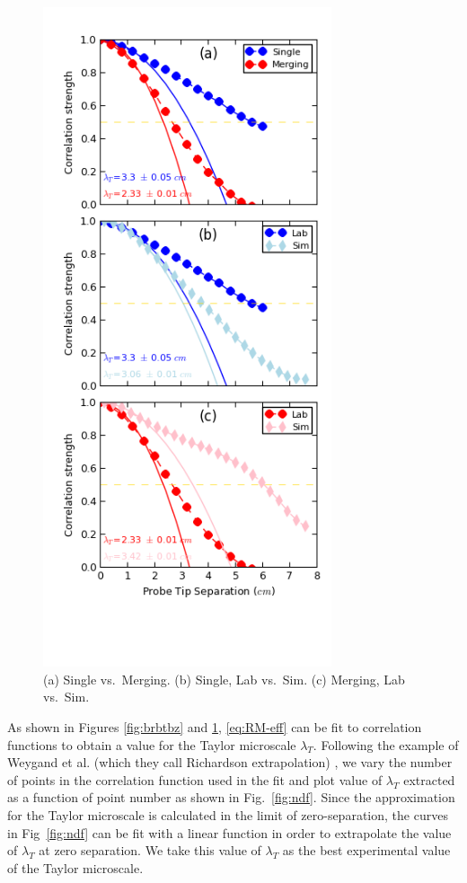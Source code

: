 \documentclass[aip,prl,amsmath,amssymb,reprint,superscriptaddress]{revtex4-1} %
\begin{document}
\begin{figure}[!htbp]
\centering
\includegraphics[width=8.5cm]{Images/comparisons.png}
\caption{\label{fig:comparisons} (a) Single vs.\ Merging. (b) Single, Lab vs.\ Sim. (c) Merging, Lab vs.\ Sim.}
\end{figure}

As shown in Figures \ref{fig:brbtbz} and \ref{fig:comparisons}, \eqref{eq:RM-eff} can be fit to correlation functions to obtain a value for the Taylor microscale $\lambda_T$. 
Following the example of Weygand et al. (which they call Richardson extrapolation) \cite{Weygand07}, we vary the number of points in the correlation function used in the fit and plot value of $\lambda_{T}$ extracted as a function of point number as shown in Fig.~\ref{fig:ndf}. Since the approximation for the Taylor microscale is calculated in the limit of zero-separation, the curves in Fig~\ref{fig:ndf} can be fit with a linear function in order to extrapolate the value of $\lambda_{T}$ at zero separation. We take this value of $\lambda_{T}$ as the best experimental value of the Taylor microscale.
\end{document}

